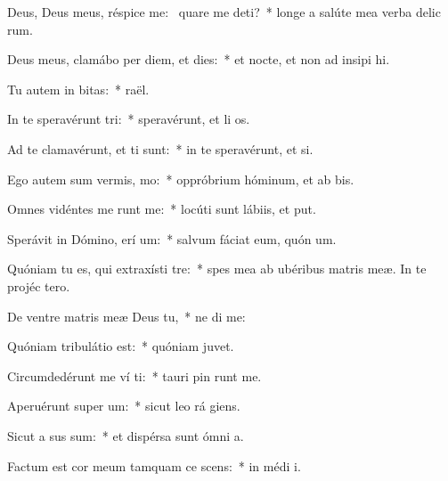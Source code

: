 \item Deus, Deus meus, réspice  me:~\pscross{} quare me deti?~* longe a salúte mea verba delic rum.
\item Deus meus, clamábo per diem, et  dies:~* et nocte, et non ad insipi hi.
\item Tu autem in  bitas:~*  raël.
\item In te speravérunt  tri:~* speravérunt, et li os.
\item Ad te clamavérunt, et  ti sunt:~* in te speravérunt, et   si.
\item Ego autem sum vermis,   mo:~* oppróbrium hóminum, et ab bis.
\item Omnes vidéntes me runt me:~* locúti sunt lábiis, et  put.
\item Sperávit in Dómino, erí um:~* salvum fáciat eum, quón  um.
\item Quóniam tu es, qui extraxísti   tre:~* spes mea ab ubéribus matris meæ. In te projéc   tero.
\item De ventre matris meæ Deus   tu,~* ne di  me:
\item Quóniam tribulátio  est:~* quóniam    juvet.
\item Circumdedérunt me ví ti:~* tauri pin runt me.
\item Aperuérunt super   um:~* sicut leo rá  giens.
\item Sicut a sus sum:~* et dispérsa sunt ómni  a.
\item Factum est cor meum tamquam ce scens:~* in médi  i.
